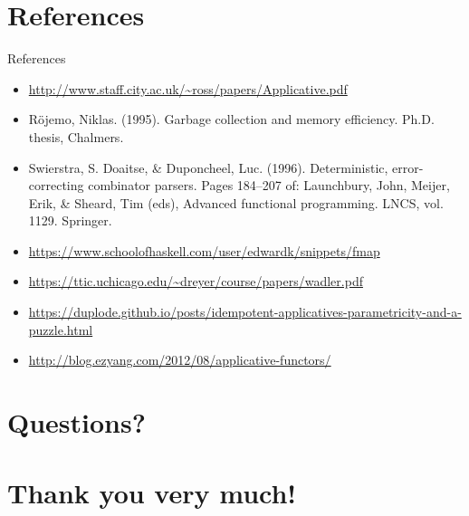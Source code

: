 \documentclass[presentation,aspectratio=169,smaller]{beamer}
\begin{document}
\section*{References}
\label{sec:orgb54cc12}
\begin{frame}[label={sec:org4dc069d}]{References}
\begin{itemize}
\item \url{http://www.staff.city.ac.uk/\~ross/papers/Applicative.pdf}
\item Röjemo, Niklas. (1995). Garbage collection and memory efficiency. Ph.D.
thesis, Chalmers.
\item Swierstra, S. Doaitse, \& Duponcheel, Luc. (1996). Deterministic,
error-correcting combinator parsers. Pages 184–207 of: Launchbury, John,
Meijer, Erik, \& Sheard, Tim (eds), Advanced functional programming. LNCS,
vol. 1129. Springer.
\item \url{https://www.schoolofhaskell.com/user/edwardk/snippets/fmap}
\item \url{https://ttic.uchicago.edu/\~dreyer/course/papers/wadler.pdf}
\item \url{https://duplode.github.io/posts/idempotent-applicatives-parametricity-and-a-puzzle.html}
\item \url{http://blog.ezyang.com/2012/08/applicative-functors/}
\end{itemize}
\end{frame}

\section{Questions?}
\label{sec:orgbd0dde8}

\section{Thank you very much!}
\label{sec:orgbf4d954}
\end{document}
